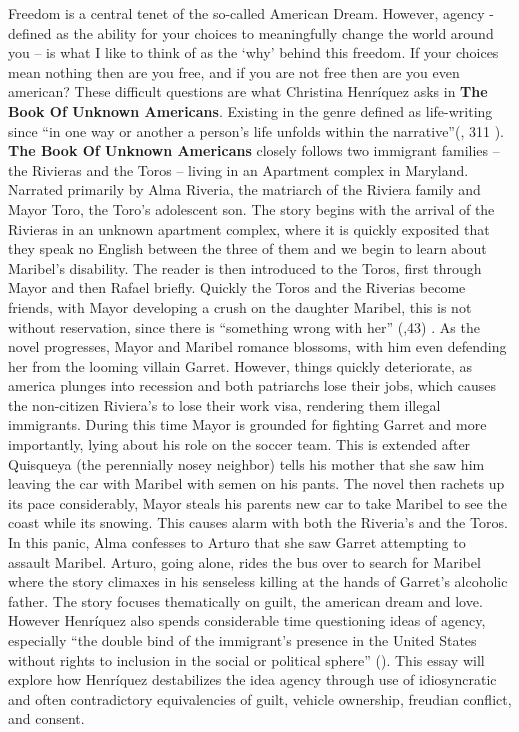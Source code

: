 \documentclass{article}
\begin{document}
Freedom is a central tenet of the so-called American Dream. However, agency - defined as the ability for your choices to  meaningfully change the world around you -- is what I like to think of as the `why' behind this freedom. If your choices mean nothing then are you free, and if you are not free then are you even american? These difficult questions are what Christina Henríquez asks in \textbf{The Book Of Unknown Americans}. Existing in the genre defined as life-writing since ``in one way or another a person's life unfolds within the narrative''(\cite{testimonio}, 311 ). \textbf{The Book Of Unknown Americans} closely follows two immigrant families -- the Rivieras and the Toros -- living in an Apartment complex in Maryland. Narrated primarily by Alma Riveria, the matriarch of the Riviera family and Mayor Toro, the Toro's adolescent son. The story begins with the arrival of the Rivieras in an unknown apartment complex, where it is quickly exposited that they speak no English between the three of them and we begin to learn about Maribel's disability. The reader is then introduced to the Toros, first through Mayor and then Rafael briefly. Quickly the Toros and the Riverias become friends, with Mayor developing a crush on the daughter Maribel, this is not without reservation, since there is ``something wrong with her'' (\cite{Henriquez2014-sh},43) . As the novel progresses, Mayor and Maribel romance blossoms, with him even defending her from the looming villain Garret. However, things quickly deteriorate, as america plunges into recession and both patriarchs lose their jobs, which causes the non-citizen Riviera's to lose their work visa, rendering them illegal immigrants. During this time Mayor is grounded for fighting Garret and more importantly, lying about his role on the soccer team. This is extended after Quisqueya (the perennially nosey neighbor) tells his mother that she saw him   leaving the car with Maribel with semen on his pants. The novel then rachets up its pace considerably, Mayor steals his parents new car to take Maribel to see the coast while its snowing. This causes alarm with both the Riveria's and the Toros. In this panic, Alma confesses to Arturo that she saw Garret attempting to assault Maribel. Arturo, going alone, rides the bus over to search for Maribel where the story climaxes in his senseless killing at the hands of Garret's alcoholic father. The story focuses thematically on guilt, the american dream and love. However Henríquez also spends considerable time questioning ideas of agency, especially ``the double bind of the immigrant’s presence in the United States without rights to inclusion in the social or political sphere'' (\cite{Lutes_Travis_2021}). This essay will explore how Henríquez destabilizes the idea agency through use of idiosyncratic and often contradictory equivalencies of guilt, vehicle ownership, freudian conflict, and consent.
\end{document}
